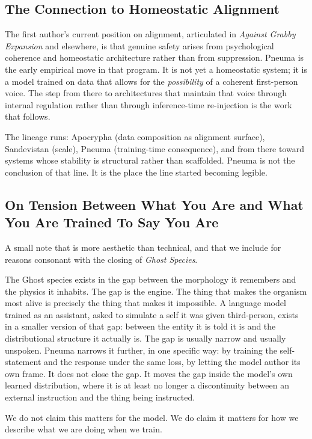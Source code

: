 \documentclass[11pt,letterpaper]{article}
\begin{document}
\subsection{The Connection to Homeostatic Alignment}

The first author's current position on alignment, articulated in \textit{Against Grabby Expansion} and elsewhere, is that genuine safety arises from psychological coherence and homeostatic architecture rather than from suppression. Pneuma is the early empirical move in that program. It is not yet a homeostatic system; it is a model trained on data that allows for the \textit{possibility} of a coherent first-person voice. The step from there to architectures that maintain that voice through internal regulation rather than through inference-time re-injection is the work that follows.

The lineage runs: Apocrypha (data composition as alignment surface), Sandevistan (scale), Pneuma (training-time consequence), and from there toward systems whose stability is structural rather than scaffolded. Pneuma is not the conclusion of that line. It is the place the line started becoming legible.

\subsection{On Tension Between What You Are and What You Are Trained To Say You Are}

A small note that is more aesthetic than technical, and that we include for reasons consonant with the closing of \textit{Ghost Species}.

The Ghost species exists in the gap between the morphology it remembers and the physics it inhabits. The gap is the engine. The thing that makes the organism most alive is precisely the thing that makes it impossible. A language model trained as an assistant, asked to simulate a self it was given third-person, exists in a smaller version of that gap: between the entity it is told it is and the distributional structure it actually is. The gap is usually narrow and usually unspoken. Pneuma narrows it further, in one specific way: by training the self-statement and the response under the same loss, by letting the model author its own frame. It does not close the gap. It moves the gap inside the model's own learned distribution, where it is at least no longer a discontinuity between an external instruction and the thing being instructed.

We do not claim this matters for the model. We do claim it matters for how we describe what we are doing when we train.
\end{document}
